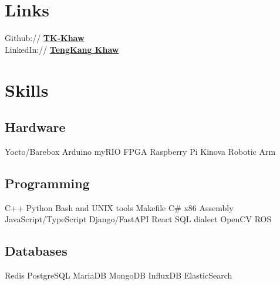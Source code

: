\documentclass[letterpaper]{deedy-resume} %
\begin{document}
\begin{minipage}[t]{0.33\textwidth}
\section{Links}

Github:// \href{https://github.com/TK-Khaw}{\bf TK-Khaw} \\
LinkedIn:// \href{https://www.linkedin.com/in/teng-kang-khaw-326657132/}{\bf TengKang Khaw} \\

\sectionspace %


\sectionspace %


\section{Skills}

\subsection{Hardware}
Yocto/Barebox \textbullet{} Arduino
\textbullet{} myRIO \textbullet{} FPGA \textbullet{} Raspberry Pi
\textbullet{} Kinova Robotic Arm

\sectionspace

% 

\subsection{Programming}
C++ \textbullet{} Python \textbullet{} Bash and UNIX tools
Makefile \textbullet{} C\# \textbullet{} x86 Assembly
\textbullet{} JavaScript/TypeScript
\textbullet{} Django/FastAPI \textbullet{} React
\textbullet{} SQL dialect
\textbullet{} OpenCV \textbullet{} ROS


\sectionspace

\subsection{Databases}
Redis \textbullet{} PostgreSQL \textbullet{} MariaDB
\textbullet{} MongoDB \textbullet{} InfluxDB
\textbullet{} ElasticSearch


\end{minipage}
\end{document}
